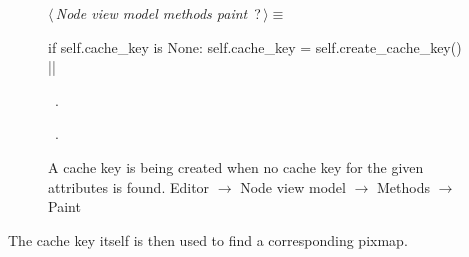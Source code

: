 \documentclass[%
    a4paper,    %
    justified,  %
    nobib,      %
    openany     %
]{tufte-book}
\begin{document}
\begin{figure}
\begin{flushleft} \small
\begin{minipage}{\linewidth}\label{scrap78}\raggedright\small
{} $\langle\,${\itshape Node view model methods paint}\nobreak\ {\footnotesize {?}}$\,\rangle\equiv$
\vspace{-1ex}
\begin{pythoncode}
if self.cache_key is None:
    self.cache_key = self.create_cache_key()
|\NWsep|
\end{pythoncode}
\vspace{1.5ex}
\footnotesize
\begin{list}{}{\setlength{\itemsep}{-\parsep}\setlength{\itemindent}{-\leftmargin}}
\item \NWtxtMacroDefBy\ .
\item \NWtxtMacroRefIn\ .

\item{}
\end{list}
\end{minipage}\vspace{4ex}
\end{flushleft}
\caption{A cache key is being created when no cache key for the given attributes
  is found.
  \newline{}\newline{}Editor $\rightarrow$ Node view model $\rightarrow$
  Methods $\rightarrow$ Paint}
\label{editor:lst:node-view-model:methods:paint:create-cache-key}
\end{figure}

The cache key itself is then used to find a corresponding pixmap.
\end{document}
